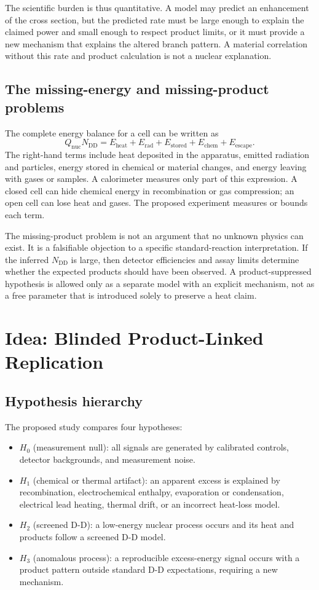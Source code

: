 \documentclass[conference]{IEEEtran}
\begin{document}
The scientific burden is thus quantitative. A model may predict an enhancement of the cross section, but the predicted rate must be large enough to explain the claimed power and small enough to respect product limits, or it must provide a new mechanism that explains the altered branch pattern. A material correlation without this rate and product calculation is not a nuclear explanation.

\subsection{The missing-energy and missing-product problems}
The complete energy balance for a cell can be written as
\begin{equation}
Q_{\mathrm{nuc}}N_{\mathrm{DD}}=E_{\mathrm{heat}}+E_{\mathrm{rad}}+E_{\mathrm{stored}}+E_{\mathrm{chem}}+E_{\mathrm{escape}}.
\label{eq:balance}
\end{equation}
The right-hand terms include heat deposited in the apparatus, emitted radiation and particles, energy stored in chemical or material changes, and energy leaving with gases or samples. A calorimeter measures only part of this expression. A closed cell can hide chemical energy in recombination or gas compression; an open cell can lose heat and gases. The proposed experiment measures or bounds each term.

The missing-product problem is not an argument that no unknown physics can exist. It is a falsifiable objection to a specific standard-reaction interpretation. If the inferred $N_{\mathrm{DD}}$ is large, then detector efficiencies and assay limits determine whether the expected products should have been observed. A product-suppressed hypothesis is allowed only as a separate model with an explicit mechanism, not as a free parameter that is introduced solely to preserve a heat claim.

\section{Idea: Blinded Product-Linked Replication}
\label{sec:idea}
\subsection{Hypothesis hierarchy}
The proposed study compares four hypotheses:
\begin{itemize}
\item $H_0$ (measurement null): all signals are generated by calibrated controls, detector backgrounds, and measurement noise.
\item $H_1$ (chemical or thermal artifact): an apparent excess is explained by recombination, electrochemical enthalpy, evaporation or condensation, electrical lead heating, thermal drift, or an incorrect heat-loss model.
\item $H_2$ (screened D-D): a low-energy nuclear process occurs and its heat and products follow a screened D-D model.
\item $H_3$ (anomalous process): a reproducible excess-energy signal occurs with a product pattern outside standard D-D expectations, requiring a new mechanism.
\end{itemize}
\end{document}
